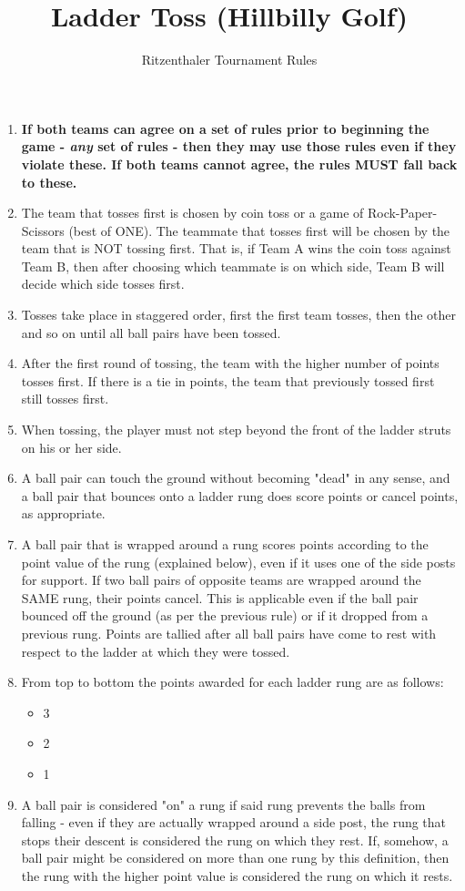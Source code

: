 \documentclass[a4paper]{article}
\title{Ladder Toss (Hillbilly Golf)}
\author{Ritzenthaler Tournament Rules}
\begin{document}
\maketitle
\begin{enumerate}
\item \textbf{If both teams can agree on a set of rules prior to beginning the game - \textit{any} set of rules - then they may use those rules even if they violate these. If both teams cannot agree, the rules MUST fall back to these.}
\item The team that tosses first is chosen by coin toss or a game of Rock-Paper-Scissors (best of ONE). The teammate that tosses first will be chosen by the team that is NOT tossing first. That is, if Team A wins the coin toss against Team B, then after choosing which teammate is on which side, Team B will decide which side tosses first.
\item Tosses take place in staggered order, first the first team tosses, then the other and so on until all ball pairs have been tossed.
\item After the first round of tossing, the team with the higher number of points tosses first. If there is a tie in points, the team that previously tossed first still tosses first.
\item When tossing, the player must not step beyond the front of the ladder struts on his or her side.
\item A ball pair can touch the ground without becoming "dead" in any sense, and a ball pair that bounces onto a ladder rung does score points or cancel points, as appropriate.
\item A ball pair that is wrapped around a rung scores points according to the point value of the rung (explained below), even if it uses one of the side posts for support. If two ball pairs of opposite teams are wrapped around the SAME rung, their points cancel. This is applicable even if the ball pair bounced off the ground (as per the previous rule) or if it dropped from a previous rung. Points are tallied after all ball pairs have come to rest with respect to the ladder at which they were tossed.
\item From top to bottom the points awarded for each ladder rung are as follows:
	\begin{itemize}
		\item 3
		\item 2
		\item 1
	\end{itemize}
\item A ball pair is considered "on" a rung if said rung prevents the balls from falling - even if they are actually wrapped around a side post, the rung that stops their descent is considered the rung on which they rest. If, somehow, a ball pair might be considered on more than one rung by this definition, then the rung with the higher point value is considered the rung on which it rests.

\end{enumerate}
\end{document}
